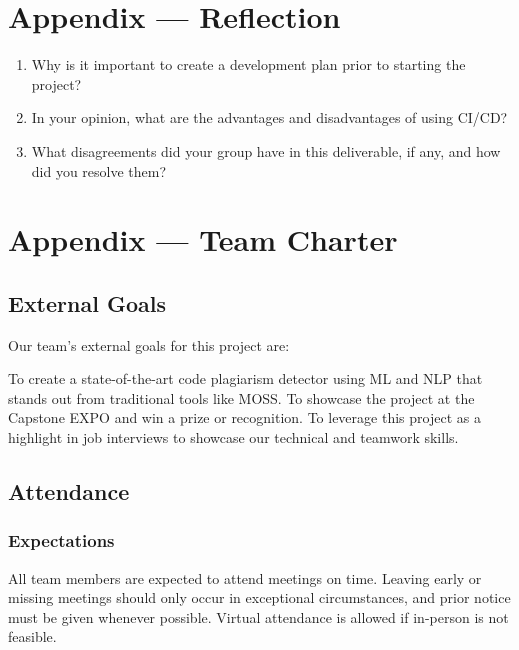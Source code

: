 \documentclass{article}
\begin{document}
\newpage{}

\section*{Appendix --- Reflection}




\begin{enumerate}
    \item Why is it important to create a development plan prior to starting the
    project?
    \item In your opinion, what are the advantages and disadvantages of using
    CI/CD?
    \item What disagreements did your group have in this deliverable, if any,
    and how did you resolve them?
\end{enumerate}

\newpage{}

\section*{Appendix --- Team Charter}

\subsection*{External Goals}

Our team’s external goals for this project are:

To create a state-of-the-art code plagiarism detector using ML and NLP that stands out from traditional tools like MOSS.
To showcase the project at the Capstone EXPO and win a prize or recognition.
To leverage this project as a highlight in job interviews to showcase our technical and teamwork skills.
\subsection*{Attendance}

\subsubsection*{Expectations}

All team members are expected to attend meetings on time. Leaving early or missing meetings should only occur in exceptional circumstances, and prior notice must be given whenever possible. Virtual attendance is allowed if in-person is not feasible.
\end{document}
